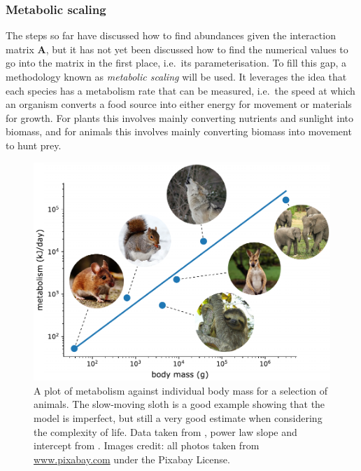 


\subsubsection{Metabolic scaling}
The steps so far have discussed how to find abundances given the interaction matrix $\mathbf{A}$, but it has not yet been discussed how to find the numerical values to go into the matrix in the first place, i.e.\ its parameterisation.
To fill this gap, a methodology known as \emph{metabolic scaling} will be used. It leverages the idea that each species has a metabolism rate that can be measured, i.e.\ the speed at which an organism converts a food source into either energy for movement or materials for growth. For plants this involves mainly converting nutrients and sunlight into biomass, and for animals this involves mainly converting biomass into movement to hunt prey.

\begin{figure}
    \centering
    \includegraphics[width=.8\textwidth]{joy/metabolism.pdf}
    \caption[A plot of metabolism against individual body mass]{A plot of metabolism against individual body mass for a selection of animals. The slow-moving sloth is a good example showing that the model is imperfect, but still a very good estimate when considering the complexity of life. Data taken from \cite{Nagy1999}, power law slope and intercept from \cite[Fig.~2]{Brown2004}. Images credit: all photos taken from \url{www.pixabay.com} under the Pixabay License.}
    \label{fig:metabolism}
\end{figure}

